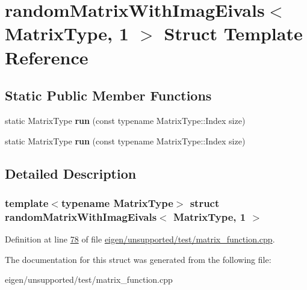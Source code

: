 \hypertarget{structrandom_matrix_with_imag_eivals_3_01_matrix_type_00_011_01_4}{}\section{random\+Matrix\+With\+Imag\+Eivals$<$ Matrix\+Type, 1 $>$ Struct Template Reference}
\label{structrandom_matrix_with_imag_eivals_3_01_matrix_type_00_011_01_4}
\subsection*{Static Public Member Functions}
\begin{DoxyCompactItemize}
\item 
\mbox{\label{structrandom_matrix_with_imag_eivals_3_01_matrix_type_00_011_01_4_a771ef6cc5b878fd4286b617d5e87e42b}} 
static Matrix\+Type {\bfseries run} (const typename Matrix\+Type\+::\+Index size)
\item 
\mbox{\label{structrandom_matrix_with_imag_eivals_3_01_matrix_type_00_011_01_4_a771ef6cc5b878fd4286b617d5e87e42b}} 
static Matrix\+Type {\bfseries run} (const typename Matrix\+Type\+::\+Index size)
\end{DoxyCompactItemize}


\subsection{Detailed Description}
\subsubsection*{template$<$typename Matrix\+Type$>$\newline
struct random\+Matrix\+With\+Imag\+Eivals$<$ Matrix\+Type, 1 $>$}



Definition at line \hyperlink{eigen_2unsupported_2test_2matrix__function_8cpp_source_l00078}{78} of file \hyperlink{eigen_2unsupported_2test_2matrix__function_8cpp_source}{eigen/unsupported/test/matrix\+\_\+function.\+cpp}.



The documentation for this struct was generated from the following file\+:\begin{DoxyCompactItemize}
\item 
eigen/unsupported/test/matrix\+\_\+function.\+cpp\end{DoxyCompactItemize}
